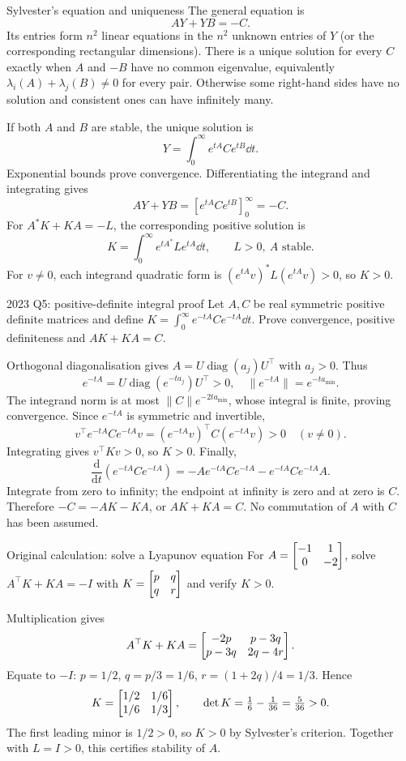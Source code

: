 \begin{concept}{Sylvester's equation and uniqueness}
The general equation is
\[AY+YB=-C.\]
Its entries form $n^2$ linear equations in the $n^2$ unknown entries of $Y$ (or the corresponding rectangular dimensions). There is a unique solution for every $C$ exactly when $A$ and $-B$ have no common eigenvalue, equivalently $\lambda_i(A)+\lambda_j(B)\ne0$ for every pair. Otherwise some right-hand sides have no solution and consistent ones can have infinitely many.

If both $A$ and $B$ are stable, the unique solution is
\[Y=\int_0^\infty e^{tA}Ce^{tB}\dd t.\]
Exponential bounds prove convergence. Differentiating the integrand and integrating gives
\[AY+YB=[e^{tA}Ce^{tB}]_0^\infty=-C.\]
For $A^*K+KA=-L$, the corresponding positive solution is
\[K=\int_0^\infty e^{tA^*}Le^{tA}\dd t,\qquad L>0,\ A\text{ stable}.\]
For $v\ne0$, each integrand quadratic form is $(e^{tA}v)^*L(e^{tA}v)>0$, so $K>0$.
\end{concept}
\begin{question}{2023 Q5: positive-definite integral proof}
Let $A,C$ be real symmetric positive definite matrices and define $K=\int_0^\infty e^{-tA}Ce^{-tA}\dd t$. Prove convergence, positive definiteness and $AK+KA=C$.
\end{question}
\begin{answer}
Orthogonal diagonalisation gives $A=U\operatorname{diag}(a_j)U^{\top}$ with $a_j>0$. Thus
\[e^{-tA}=U\operatorname{diag}(e^{-ta_j})U^{\top}>0,\quad\|e^{-tA}\|=e^{-t a_{\min}}.\]
The integrand norm is at most $\|C\|e^{-2ta_{\min}}$, whose integral is finite, proving convergence. Since $e^{-tA}$ is symmetric and invertible,
\[v^{\top}e^{-tA}Ce^{-tA}v=(e^{-tA}v)^{\top}C(e^{-tA}v)>0\quad(v\ne0).\]
Integrating gives $v^{\top}Kv>0$, so $K>0$. Finally,
\[\frac{\mathrm d}{\mathrm dt}(e^{-tA}Ce^{-tA})=-Ae^{-tA}Ce^{-tA}-e^{-tA}Ce^{-tA}A.\]
Integrate from zero to infinity; the endpoint at infinity is zero and at zero is $C$. Therefore $-C=-AK-KA$, or $AK+KA=C$. No commutation of $A$ with $C$ has been assumed.
\end{answer}
\begin{question}{Original calculation: solve a Lyapunov equation}
For $A=\begin{bmatrix}-1&1\\0&-2\end{bmatrix}$, solve $A^{\top}K+KA=-I$ with $K=\begin{bmatrix}p&q\\q&r\end{bmatrix}$ and verify $K>0$.
\end{question}
\begin{answer}
Multiplication gives
\[A^{\top}K+KA=\begin{bmatrix}-2p&p-3q\\p-3q&2q-4r\end{bmatrix}.\]
Equate to $-I$: $p=1/2$, $q=p/3=1/6$, $r=(1+2q)/4=1/3$. Hence
\[K=\begin{bmatrix}1/2&1/6\\1/6&1/3\end{bmatrix},\qquad\det K=\tfrac16-\tfrac1{36}=\tfrac5{36}>0.\]
The first leading minor is $1/2>0$, so $K>0$ by Sylvester's criterion. Together with $L=I>0$, this certifies stability of $A$.
\end{answer}
